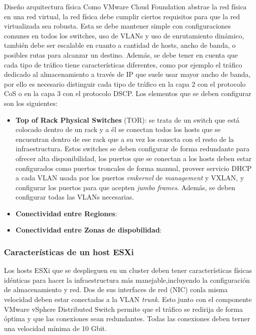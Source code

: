 \begin{subsection}{Diseño arquitectura física}
Como VMware Cloud Foundation abstrae la red física en una red virtual, la red física debe cumplir ciertos requisitos para que la red virtualizada sea robusta. Esta se debe mantener simple con configuraciones comunes en todos los switches, uso de VLANs y uso de enrutamiento dinámico, también debe ser escalable en cuanto a cantidad de hosts, ancho de banda, o posibles rutas para alcanzar un destino. Además, se debe tener en cuenta que cada tipo de tráfico tiene características diferentes, como por ejemplo el tráfico dedicado al almacenamiento a través de IP que suele usar mayor ancho de banda, por ello es necesario distinguir cada tipo de tráfico en la capa 2 con el protocolo CoS o en la capa 3 con el protocolo DSCP. Los elementos que se deben configurar son los siguientes:
\begin{itemize}
    \item \textbf{Top of Rack Physical Switches} (TOR): se trata de un switch que está colocado dentro de un rack y a él se conectan todos los hosts que se encuentran dentro de ese rack que a su vez los conecta con el resto de la infraestructura. Estos switches se deben configurar de forma redundante para ofrecer alta disponibilidad, los puertos que se conectan a los hosts deben estar configurados como puertos troncales de forma manual, proveer servicio DHCP a cada VLAN usada por los puertos \textit{vmkernel} de \textit{management} y VXLAN, y configurar los puertos para que acepten \textit{jumbo frames}. Además, se deben configurar todas las VLANs necesarias.
    \item \textbf{Conectividad entre Regiones}: 
    \item \textbf{Conectividad entre Zonas de dispobilidad}:
\end{itemize}

\subsubsection{Características de un host ESXi}
Los hosts ESXi que se desplieguen en un cluster deben tener características físicas idénticas para hacer la infraestructura más manejable,incluyendo la configuración de almacenamiento y red.
Dos de sus interfaces de red (NIC) conla misma velocidad deben estar conectadas a la VLAN \textit{trunk}. Esto junto con el componente VMware vSphere Distributed Switch permite que el tráfico se redirija de forma óptima y que las conexiones sean redundantes. Todas las conexiones deben terner una velocidad mínima de 10 Gbit.

\end{subsection}

